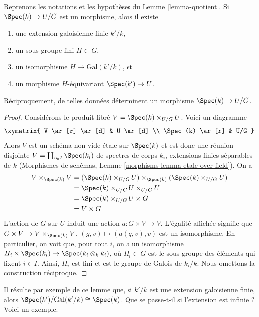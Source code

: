 \begin{lemma}
\label{lemma-quotient-field-map}
Reprenons les notations et les hypothèses du Lemme \ref{lemma-quotient}.
Si $\Spec(k) \to U/G$ est un morphisme, alors il existe
\begin{enumerate}
\item une extension galoisienne finie $k'/k$,
\item un sous-groupe fini $H \subset G$,
\item un isomorphisme $H \to \text{Gal}(k'/k)$, et
\item un morphisme $H$-équivariant $\Spec(k') \to U$.
\end{enumerate}
Réciproquement, de telles données déterminent un morphisme $\Spec(k) \to U/G$.
\end{lemma}

\begin{proof}
Considérons le produit fibré $V = \Spec(k) \times_{U/G} U$.
Voici un diagramme
$$
\xymatrix{
V \ar[r] \ar[d] & U \ar[d] \\
\Spec(k) \ar[r] & U/G
}
$$
Alors $V$ est un schéma non vide \'etale sur $\Spec(k)$ et est donc une
réunion disjointe $V = \coprod_{i \in I} \Spec(k_i)$
de spectres de corps $k_i$, extensions finies séparables de $k$
(Morphismes de schémas, Lemme \ref{morphisms-lemma-etale-over-field}).
On a
\begin{align*}
V \times_{\Spec(k)} V
& =
(\Spec(k) \times_{U/G} U) \times_{\Spec(k)}(\Spec(k) \times_{U/G} U) \\
& = 
\Spec(k) \times_{U/G} U \times_{U/G} U \\
& =
\Spec(k) \times_{U/G} U \times G \\
& =
V \times G
\end{align*}
L'action de $G$ sur $U$ induit une action $a : G \times V \to V$.
L'égalité affichée signifie que
$G \times V \to V \times_{\Spec(k)} V$, $(g, v) \mapsto (a(g, v), v)$
est un isomorphisme. En particulier, on voit que, pour tout $i$, on a
un isomorphisme $H_i \times \Spec(k_i) \to \Spec(k_i \otimes_k k_i)$,
où $H_i \subset G$ est le sous-groupe des éléments qui fixent $i \in I$.
Ainsi, $H_i$ est fini et est le groupe de Galois de $k_i/k$.
Nous omettons la construction réciproque.
\end{proof}

\noindent
Il résulte par exemple de ce lemme que,
si $k'/k$ est une extension galoisienne finie, alors
$\Spec(k')/\text{Gal}(k'/k) \cong \Spec(k)$.
Que se passe-t-il si l'extension est infinie ? Voici un exemple.


